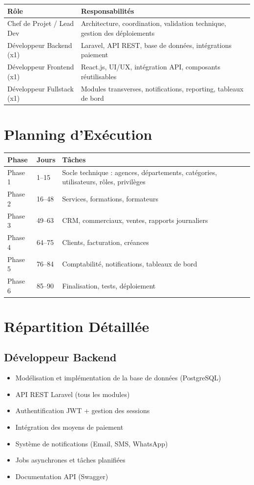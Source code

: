 \documentclass[12pt,a4paper]{report}
\begin{document}
{\small
\noindent\begin{tabularx}{\textwidth}{l X}
    \toprule
    \textbf{Rôle} & \textbf{Responsabilités} \\
    \midrule
    Chef de Projet / Lead Dev & Architecture, coordination, validation technique, gestion des déploiements \\
    Développeur Backend (x1) & Laravel, API REST, base de données, intégrations paiement \\
    Développeur Frontend (x1) & React.js, UI/UX, intégration API, composants réutilisables \\
    Développeur Fullstack (x1) & Modules transverses, notifications, reporting, tableaux de bord \\
    \bottomrule
\end{tabularx}}

\section{Planning d'Exécution}

\begin{tabularx}{\textwidth}{l l X}
    \toprule
    \textbf{Phase} & \textbf{Jours} & \textbf{Tâches} \\
    \midrule
    Phase 1 & 1--15 & Socle technique : agences, départements, catégories, utilisateurs, rôles, privilèges \\
    Phase 2 & 16--48 & Services, formations, formateurs \\
    Phase 3 & 49--63 & CRM, commerciaux, ventes, rapports journaliers \\
    Phase 4 & 64--75 & Clients, facturation, créances \\
    Phase 5 & 76--84 & Comptabilité, notifications, tableaux de bord \\
    Phase 6 & 85--90 & Finalisation, tests, déploiement \\
    \bottomrule
\end{tabularx}

\section{Répartition Détaillée}

\subsection*{Développeur Backend}
\begin{itemize}
    \item Modélisation et implémentation de la base de données (PostgreSQL)
    \item API REST Laravel (tous les modules)
    \item Authentification JWT + gestion des sessions
    \item Intégration des moyens de paiement
    \item Système de notifications (Email, SMS, WhatsApp)
    \item Jobs asynchrones et tâches planifiées
    \item Documentation API (Swagger)
\end{itemize}
\end{document}
